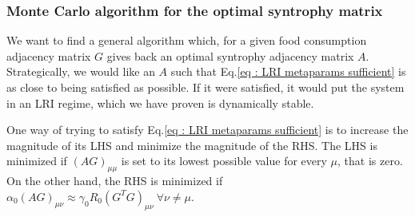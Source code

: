 \documentclass[12pt, titlepage]{report}
\begin{document}
\subsubsection{Monte Carlo algorithm for the optimal syntrophy matrix} \label{section : methods LRI MC solver}
We want to find a general algorithm which, for a given food consumption adjacency matrix $G$ gives back an optimal syntrophy adjacency matrix $A$. Strategically, we would like an $A$ such that Eq.\eqref{eq : LRI metaparams sufficient} is as close to being satisfied as possible. If it were satisfied, it would put the system in an LRI regime, which we have proven is dynamically stable.

One way of trying to satisfy Eq.\eqref{eq : LRI metaparams sufficient} is to increase the magnitude of its LHS and minimize the magnitude of the RHS. The LHS is minimized if $(AG)_{\mu\mu}$ is set to its lowest possible value for every $\mu$, that is zero. On the other hand, the RHS is minimized if $\alpha_0(AG)_{\mu\nu}\approx\gamma_0R_0 (G^TG)_{\mu\nu} \ \forall \nu\neq\mu$.
\end{document}
